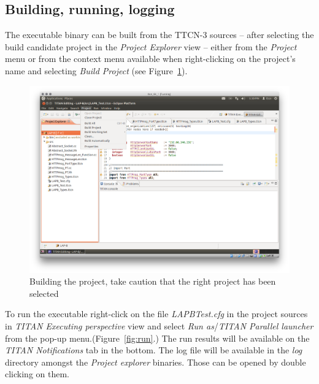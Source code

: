 \documentclass[a4paper]{article}
\begin{document}
\subsection{Building, running, logging}

The executable binary can be built from the TTCN-3 sources -- after selecting the build candidate project in the
\textit{Project Explorer} view -- either from the \textit{Project} menu or from the context menu available when
right-clicking on the project's name and selecting \textit{Build Project} (see Figure~\ref{fig:build}).

\begin{figure}[H]
    \centering
    \includegraphics[width=\textwidth]{figures/build.png}
    \caption{Building the project, take caution that the right project has been selected}
    \label{fig:build}
\end{figure}

To run the executable right-click on the file \textit{LAPB{\textunderscore}Test.cfg} in the project sources in
\textit{TITAN Executing perspective} view and select \textit{Run as}/\textit{TITAN Parallel launcher} from the pop-up
menu.(Figure~\ref{fig:run}.)
The run results will be available on the \textit{TITAN Notifications} tab in the bottom. The log file will be available
in the \textit{log} directory amongst the \textit{Project explorer} binaries. Those can be opened by double clicking on
them.
\end{document}
